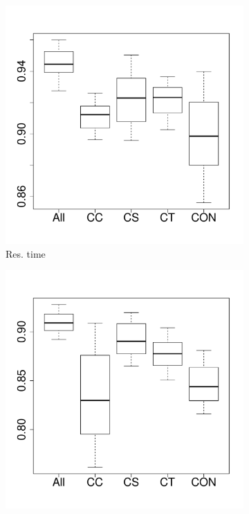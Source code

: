 \begin{figure}[t]
	\centering
        \begin{subfigure}{0.19\textwidth}
                \includegraphics[width=\linewidth]{Figures/runtime-hadoopremove-importance.pdf}
                \caption{Res. time}
        \end{subfigure}%
        \begin{subfigure}{0.19\textwidth}
                \includegraphics[width=\linewidth]{Figures/cpu-hadoopremove-importance.pdf}

\end{subfigure}
\end{figure}
